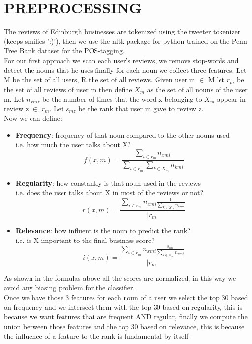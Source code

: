 \documentclass[a4paper, 10pt, conference]{ieeeconf}      %
\begin{document}
\section{PREPROCESSING}
The reviews of Edinburgh businesses are tokenized using the tweeter tokenizer (keeps smilies ':)'), then we use the nltk package for python trained on the  Penn Tree Bank dataset for the POS-tagging.\\
For our first approach we scan each user's reviews, we remove stop-words and detect the nouns that he uses finally for each noun we collect three features.
Let M be the set of all users, R the set of all reviews.
Given user m $\in$ M let $r_m$ be the set of all reviews of user m then define $X_m$ as the set of all nouns of the user m.
Let $n_{xmz}$ be the number of times that the word x belonging to $X_m$ appear in review z $\in$ $r_m.$
Let $s_{mz}$ be the rank that user m gave to review z.\\
Now we can define:
\begin{itemize}
	\item \textbf{Frequency}: frequency of that noun compared to the other nouns used\\
	i.e. how much the user talks about X?
	\[ f(x,m)= \frac{\sum_{i \in r_m}n_{xmi}}{\sum_{i \in r_m}\sum_{k \in X_m} n_{kmi}} \]
	\item \textbf{Regularity}: how constantly is that noun used in the reviews\\
	i.e. does the user talks about X in most of the reviews or not?
	\[ r(x,m)= \frac{\sum_{i \in r_m}
		n_{xmi}  \frac{1}{\sum_{k \in X_m}n_{kmi}}}	
	{|r_m|} \]
	\item \textbf{Relevance}: how influent is the noun to predict the rank?\\
	i.e. is X important to the final business score?
	\[ i(x,m)= \frac{\sum_{i \in r_m}
		n_{xmi}  \frac{s_{mi}}{\sum_{k \in X_m}n_{kmi}}}	
	{|r_m|} \]
\end{itemize}
 As shown in the formulas above all the scores are normalized, in this way we avoid any biasing problem for the classifier.\\

Once we have those 3 features for each noun of a user we select the top 30 based on frequency and we intersect them with the top 30 based on regularity, this is because we want features that are frequent AND regular, finally we compute the union between those features and the top 30 based on relevance, this is because the influence of a feature to the rank is fundamental by itself. 
 
\end{document}
